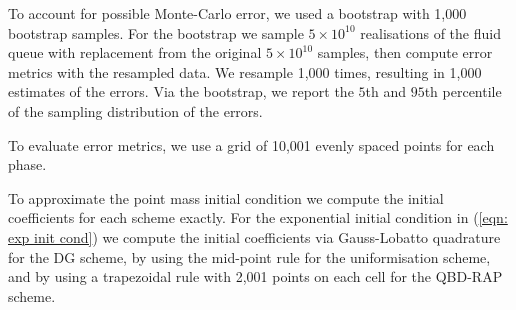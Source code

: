To account for possible Monte-Carlo error, we used a bootstrap with 1,000 bootstrap samples. For the bootstrap we sample \(5\times 10^{10}\) realisations of the fluid queue with replacement from the original \(5\times 10^{10}\) samples, then compute error metrics with the resampled data. We resample 1,000 times, resulting in 1,000 estimates of the errors. Via the bootstrap, we report the \(5\)th and \(95\)th percentile of the sampling distribution of the errors. 

To evaluate error metrics, we use a grid of 10,001 evenly spaced points for each phase.

To approximate the point mass initial condition we compute the initial coefficients for each scheme exactly. For the exponential initial condition in (\ref{eqn: exp init cond}) we compute the initial coefficients via Gauss-Lobatto quadrature for the DG scheme, by using the mid-point rule for the uniformisation scheme, and by using a trapezoidal rule with 2,001 points on each cell for the QBD-RAP scheme. 

